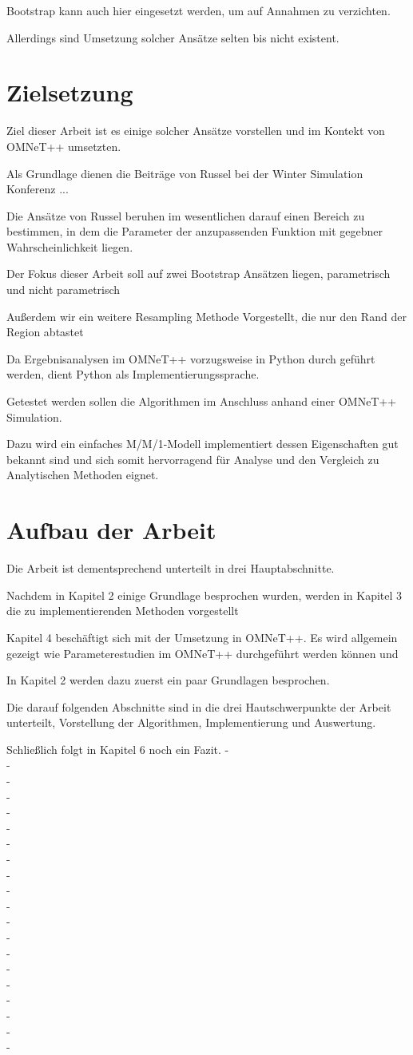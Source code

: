 Bootstrap kann auch hier eingesetzt werden, um auf Annahmen zu verzichten.

Allerdings sind Umsetzung solcher Ansätze selten bis nicht existent.


\section{Zielsetzung}
Ziel dieser Arbeit ist es einige solcher Ansätze vorstellen und im Kontekt von OMNeT++ umsetzten.

Als Grundlage dienen die Beiträge von Russel bei der Winter Simulation Konferenz ...

Die Ansätze von Russel beruhen im wesentlichen darauf einen Bereich zu bestimmen, in dem die Parameter der anzupassenden Funktion mit gegebner Wahrscheinlichkeit liegen.

Der Fokus dieser Arbeit soll auf zwei Bootstrap Ansätzen liegen, parametrisch und nicht parametrisch

Außerdem wir ein weitere Resampling Methode Vorgestellt, die nur den Rand der Region abtastet

Da Ergebnisanalysen im OMNeT++ vorzugsweise in Python durch geführt werden, dient Python als Implementierungssprache.

Getestet werden sollen die Algorithmen im Anschluss anhand einer OMNeT++ Simulation.

Dazu wird ein einfaches M/M/1-Modell implementiert dessen Eigenschaften gut bekannt sind und sich somit hervorragend für Analyse und den Vergleich zu Analytischen Methoden eignet.

\section{Aufbau der Arbeit}
Die Arbeit ist dementsprechend unterteilt in drei Hauptabschnitte.

Nachdem in Kapitel 2 einige Grundlage besprochen wurden, werden in Kapitel 3 die zu implementierenden Methoden vorgestellt

Kapitel 4 beschäftigt sich mit der Umsetzung in OMNeT++. Es wird allgemein gezeigt wie Parameterestudien im OMNeT++ durchgeführt werden können und 

In Kapitel 2 werden dazu zuerst ein paar Grundlagen besprochen.

Die darauf folgenden Abschnitte sind in die drei Hautschwerpunkte der Arbeit unterteilt, Vorstellung der Algorithmen, Implementierung und Auswertung.

Schließlich folgt in Kapitel 6 noch ein Fazit.
- \\
- \\
- \\
- \\
- \\
- \\
- \\
- \\
- \\
- \\
- \\
- \\
- \\
- \\
- \\
- \\
- \\
- \\
- \\
- \\